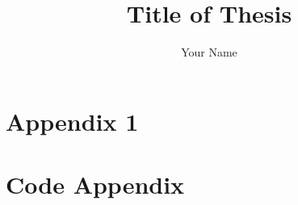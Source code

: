 \documentclass{DEIthesis}
\title{Title of Thesis}
\author{Your Name}
\begin{document}
\frontmatter
\maketitle




\tableofcontents
\mainmatter




\backmatter

\chapter{Appendix 1}
\label{app:appendix1}


\chapter{Code Appendix}
\label{app:code}

\end{document}
